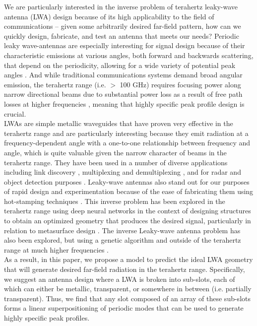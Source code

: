 \documentclass[11pt]{article}
\begin{document}
\noindent We are particularly interested in the inverse problem of terahertz leaky-wave antenna (LWA) design because of its high applicability to the field of communications -- given some arbitrarily desired far-field pattern, how can we quickly design, fabricate, and test an antenna that meets our needs? Periodic leaky wave-antennas are especially interesting for signal design because of their characteristic emissions at various angles, both forward and backwards scattering, that depend on the periodicity, allowing for a wide variety of potential peak angles \cite{6556051}. And while traditional communications systems demand broad angular emission, the terahertz range (i.e. $>$ 100 GHz) requires focusing power along narrow directional beams due to substantial power loss as a result of free path losses at higher frequencies \cite{doi:10.1063/1.5014037, Ghasempour:2020tz}, meaning that highly specific peak profile design is crucial. \\

\noindent LWAs are simple metallic waveguides that have proven very effective in the terahertz range and are particularly interesting because they emit radiation at a frequency-dependent angle with a one-to-one relationship between frequency and angle, which is quite valuable given the narrow character of beams in the terahertz range. \cite{doi:10.1063/5.0033126} They have been used in a number of diverse applications including link discovery \cite{Ghasempour:2020tz}, multiplexing and demultiplexing \cite{Karl:2015uh, Ma:2017vo}, and for radar and object detection purposes \cite{Amarasinghe:20, Amarasinghe:21}. Leaky-wave antennas also stand out for our purposes of rapid design and experimentation because of the ease of fabricating them using hot-stamping techniques \cite{Guerboukha:21}. This inverse problem has been explored in the terahertz range using deep neural networks in the context of designing structures to obtain an optimized geometry that produces the desired signal, particularly in relation to metasurface design \cite{Deng:21, 9602997}. The inverse Leaky-wave antenna problem has also been explored, but using a genetic algorithm and outside of the terahertz range at much higher frequencies \cite{Jafar-Zanjani:2018vy}. \\

\noindent As a result, in this paper, we propose a model to predict the ideal LWA geometry that will generate desired far-field radiation in the terahertz range. Specifically, we suggest an antenna design where a LWA is broken into sub-slots, each of which can either be metallic, transparent, or somewhere in between (i.e. partially transparent). Thus, we find that any slot composed of an array of these sub-slots forms a linear superpositioning of periodic modes that can be used to generate highly specific peak profiles.
\end{document}
